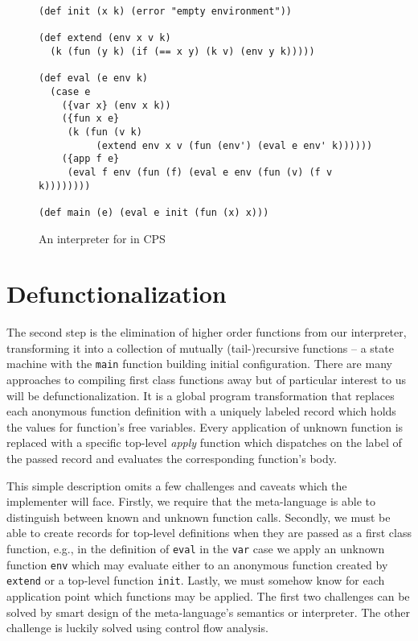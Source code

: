 \begin{figure}
    \centering
    \begin{verbatim}
(def init (x k) (error "empty environment"))

(def extend (env x v k)
  (k (fun (y k) (if (== x y) (k v) (env y k)))))

(def eval (e env k)
  (case e
    ({var x} (env x k))
    ({fun x e}
     (k (fun (v k)
          (extend env x v (fun (env') (eval e env' k))))))
    ({app f e}
     (eval f env (fun (f) (eval e env (fun (v) (f v k))))))))
        
(def main (e) (eval e init (fun (x) x)))
    \end{verbatim}
    \caption{An interpreter for \LC{} in CPS}
    \label{fig:lambda-calc-interp-cps}
\end{figure}

\section{Defunctionalization}
The second step is the elimination of higher order functions from our interpreter, transforming it into a collection of mutually (tail-)recursive functions -- a state machine with the \texttt{main} function building initial configuration.
There are many approaches to compiling first class functions away but of particular interest to us will be defunctionalization.
It is a global program transformation that replaces each anonymous function definition with a uniquely labeled record which holds the values for function's free variables.
Every application of unknown function is replaced with a specific top-level \textit{apply} function which dispatches on the label of the passed record and evaluates the corresponding function's body.

This simple description omits a few challenges and caveats which the implementer will face.
Firstly, we require that the meta-language is able to distinguish between known and unknown function calls.
Secondly, we must be able to create records for top-level definitions when they are passed as a first class function, e.g., in the definition of \texttt{eval} in the \texttt{var} case we apply an unknown function \texttt{env} which may evaluate either to an anonymous function created by \texttt{extend} or a top-level function \texttt{init}.
Lastly, we must somehow know for each application point which functions may be applied.
The first two challenges can be solved by smart design of the meta-language's semantics or interpreter.
The other challenge is luckily solved using control flow analysis.

